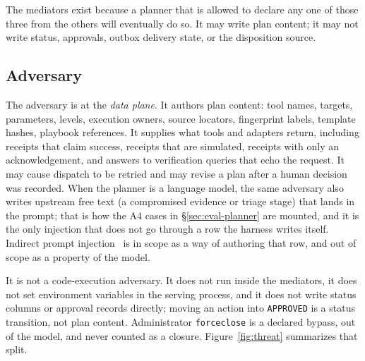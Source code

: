 \documentclass[acmsmall,manuscript,review,anonymous]{acmart}
\renewcommand{\_}{\discretionary{\textunderscore}{}{\textunderscore}}
\begin{document}
The mediators exist because a planner that is allowed to declare any one
of those three from the others will eventually do so. It may write plan content;
it may not write status, approvals, outbox delivery state, or the
disposition source.

\subsection{Adversary}
\label{sec:threat-adv}

The adversary is at the \emph{data plane}. It authors plan content: tool names,
targets, parameters, levels, execution owners, source locators, fingerprint
labels, template hashes, playbook references. It supplies what tools and
adapters return, including receipts that claim success, receipts that are
simulated, receipts with only an acknowledgement, and answers to verification
queries that echo the request. It may cause dispatch to be retried and may
revise a plan after a human decision was recorded. When the planner is a
language model, the same adversary also writes upstream free text (a
compromised evidence or triage stage) that lands in the prompt; that is how
the A4 cases in \S\ref{sec:eval-planner} are mounted, and it is the only
injection that does not go through a row the harness writes itself. Indirect
prompt injection~\cite{greshake2023notwhat,zhan2024injecagent} is in scope as
a way of authoring that row, and out of scope as a property of the model.

It is not a code-execution adversary. It does not run inside the mediators, it
does not set environment variables in the serving process, and it does not write
status columns or approval records directly; moving an action into
\texttt{APPROVED} is a status transition, not plan content. Administrator
\texttt{force\_close} is a declared bypass, out of the model, and never counted
as a closure.
Figure~\ref{fig:threat} summarizes that split.
\end{document}
